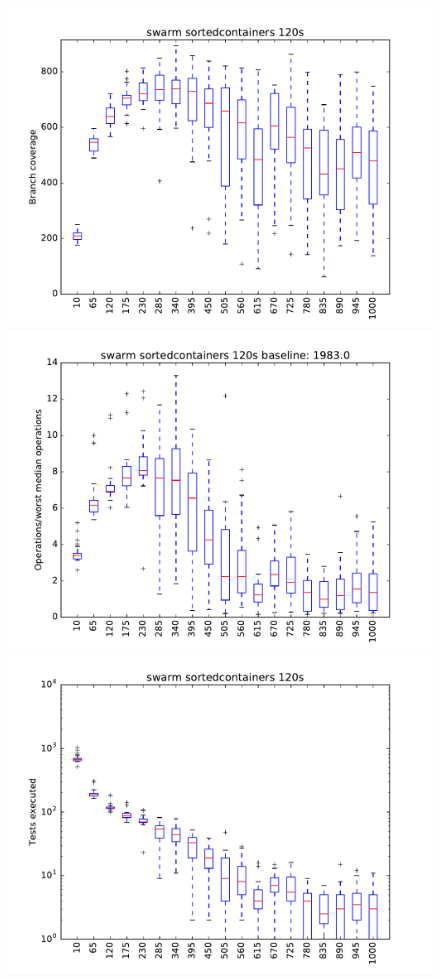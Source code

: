 \begin{figure}
\includegraphics[width=\columnwidth]{graphs/sortedcontainersswarm120}
\includegraphics[width=\columnwidth]{graphs/opssortedcontainersswarm120}
\includegraphics[width=\columnwidth]{graphs/execsortedcontainersswarm120}
\end{figure}

